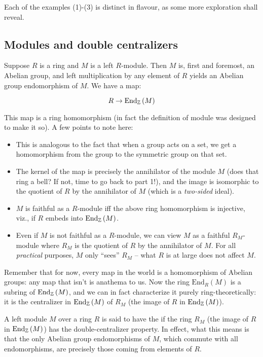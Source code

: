 \documentclass[a4paper]{amsart}
\newcommand{\Endo}[2]{\text{End}_{#1}\left(#2\right)}
\begin{document}
Each of the examples (1)-(3) is distinct in flavour, as some more
exploration shall reveal.

\subsection{Modules and double centralizers}

Suppose $R$ is a ring and $M$ is a left $R$-module. Then $M$ is, first
and foremost, an Abelian group, and left multiplication by any element
of $R$ yields an Abelian group endomorphism of $M$. We have a map:

$$R \to \Endo{\Z}{M}$$

This map is a ring homomorphism (in fact the definition of module was
designed to make it so). A few points to note here:

\begin{itemize}

\item This is analogous to the fact that when a group acts on a set,
  we get a homomorphism from the group to the symmetric group on that
  set.

\item The kernel of the map is precisely the annihilator of the module
  $M$ (does that ring a bell? If not, time to go back to part 1!), and
  the image is isomorphic to the quotient of $R$ by the annihilator of
  $M$ (which is a {\em two-sided} ideal).

\item $M$ is faithful as a $R$-module iff the above ring homomorphism
  is injective, viz., if $R$ embeds into $\Endo{\Z}{M}$.

\item Even if $M$ is not faithful as a $R$-module, we can view $M$ as
  a faithful $R_M$-module where $R_M$ is the quotient of $R$ by the
  annihilator of $M$. For all {\em practical} purposes, $M$ only
  ``sees'' $R_M$ -- what $R$ is at large does not affect $M$.

\end{itemize}
 
Remember that for now, every map in the world is a homomorphism of
Abelian groups: any map that isn't is anathema to us. Now the ring
$\Endo{R}{M}$ is a subring of $\Endo{\Z}{M}$, and we can in fact
characterize it purely ring-theoretically: it is the centralizer in
$\Endo{\Z}{M}$ of $R_M$ (the image of $R$ in $\Endo{\Z}{M}$).

\begin{definer}
  A left module $M$ over a ring $R$ is said to have the
   if the ring
  $R_M$ (the image of $R$ in $\Endo{\Z}{M}$) has the
  double-centralizer property. In effect, what this means is that the
  only Abelian group endomorphisms of $M$, which commute with all
  endomorphisms, are precisely those coming from elements of $R$.
\end{definer}
\end{document}
